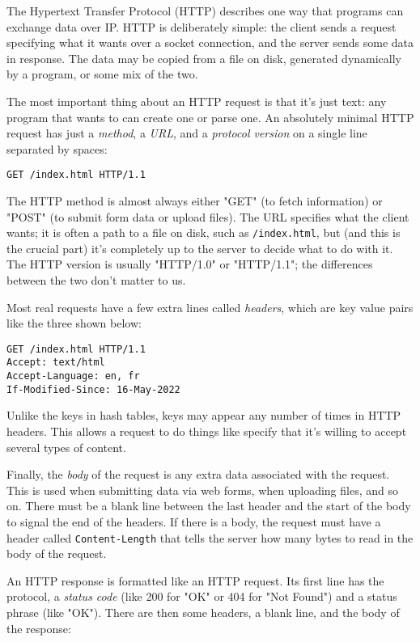 \documentclass{scrbook}
\begin{document}
The Hypertext Transfer Protocol (HTTP) describes one way that
programs can exchange data over IP.
HTTP is deliberately simple:
the client sends a request specifying what it wants over a socket connection,
and the server sends some data in response.
The data may be copied from a file on disk,
generated dynamically by a program,
or some mix of the two.


The most important thing about an HTTP request is that it's just text:
any program that wants to can create one or parse one.
An absolutely minimal HTTP request has just a \emph{method},
a \emph{URL},
and a \emph{protocol version}
on a single line separated by spaces:

\begin{lstlisting}[frame=single,frameround=tttt]
GET /index.html HTTP/1.1
\end{lstlisting}


The HTTP method is almost always either "GET" (to fetch information)
or "POST" (to submit form data or upload files).
The URL specifies what the client wants;
it is often a path to a file on disk,
such as \texttt{/index.html},
but (and this is the crucial part)
it's completely up to the server to decide what to do with it.
The HTTP version is usually "HTTP/1.0" or "HTTP/1.1";
the differences between the two don't matter to us.


Most real requests have a few extra lines called \emph{headers},
which are key value pairs like the three shown below:

\begin{lstlisting}[frame=single,frameround=tttt]
GET /index.html HTTP/1.1
Accept: text/html
Accept-Language: en, fr
If-Modified-Since: 16-May-2022
\end{lstlisting}


Unlike the keys in hash tables,
keys may appear any number of times in HTTP headers.
This allows a request to do things like
specify that it's willing to accept several types of content.


Finally,
the \emph{body} of the request is any extra data associated with the request.
This is used when submitting data via web forms,
when uploading files,
and so on.
There must be a blank line between the last header and the start of the body
to signal the end of the headers.
If there is a body,
the request must have a header called \texttt{Content-Length}
that tells the server how many bytes to read in the body of the request.


An HTTP response is formatted like an HTTP request.
Its first line has the protocol,
a \emph{status code} (like 200 for "OK" or 404 for "Not Found")
and a status phrase (like "OK").
There are then some headers,
a blank line,
and the body of the response:
\end{document}
